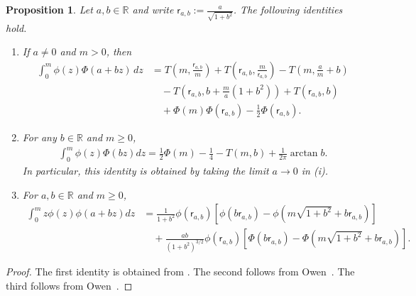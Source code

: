 \documentclass[11pt]{article}
\theoremstyle{plain}
\newtheorem{proposition}[theorem]{Proposition}
\theoremstyle{definition}
\providecommand{\mathbbm}{\mathbb} %
\newcommand{\R}{\mathbbm{R}}
\newcommand{\sfr}{\mathsf{r}}
\newcommand{\inparen}[1]{\left(#1\right)}             %
\newcommand{\insquare}[1]{\left[#1\right]}             %
\begin{document}
\begin{proposition}
\label{prop:OwensTProp}
Let $a,b\in\R$ and write $\sfr_{a,b}:=\frac{a}{\sqrt{1+b^2}}$. The following identities hold.
\begin{enumerate}[label=(\roman*)]
\item If $a\neq0$ and $m>0$, then
\begin{align*}
    \int_0^m \phi(z)\Phi(a+bz)\,dz
    &=
    T \inparen{m, \frac{\sfr_{a,b}}{m}}
    + T \inparen{\sfr_{a,b}, \frac{m}{\sfr_{a,b}}}
    - T \inparen{m, \frac{a}{m}+b} \\
    &\quad
    - T \inparen{\sfr_{a,b}, b+\frac{m}{a}(1+b^2)}
    + T \inparen{\sfr_{a,b},b} \\
    &\quad
    + \Phi(m)\Phi \inparen{\sfr_{a,b}}
    -\frac{1}{2}\Phi \inparen{\sfr_{a,b}} .
\end{align*}
\item For any $b\in\R$ and $m\ge 0$,
\begin{align*}
\int_0^m \phi(z)\Phi(bz)dz
=
\frac12\Phi(m)-\frac14-T(m,b)+\frac{1}{2\pi}\arctan b.
\end{align*}
In particular, this identity is obtained by taking the limit $a\to 0$ in \textup{(i)}.
\item
For $a,b\in\R$ and $m\ge 0$,
\begin{align*}
\int_0^m z\phi(z)\phi(a+bz)dz
&=
\frac{1}{1+b^2}\phi \inparen{\sfr_{a,b}}
\insquare{
\phi \inparen{b\sfr_{a,b}}
- \phi \inparen{ m \sqrt{1+b^2} + b\sfr_{a,b}}
} \\
&\quad
+
\frac{ab}{(1+b^2)^{3/2}}\phi \inparen{\sfr_{a,b}}
\insquare{
\Phi \inparen{b\sfr_{a,b}}
- \Phi \inparen{ m \sqrt{1+b^2} + b\sfr_{a,b}}
}.
\end{align*}
\end{enumerate}
\end{proposition}

\begin{proof} 
The first identity is obtained from \cite[Table I, entry $10,010.3$]{owen1980table}. The second follows from
Owen~\cite[Table I, entry $1,010.1$]{owen1980table}. The third follows from Owen~\cite[Table I, entry $111$]{owen1980table}.
\end{proof}
\end{document}
